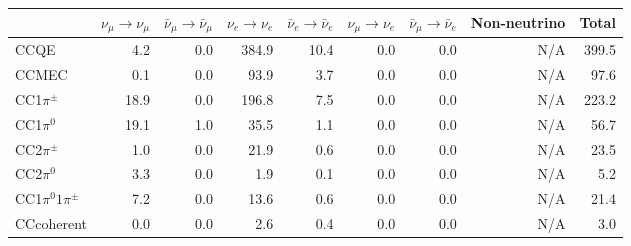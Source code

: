 \newpage
\begin{table}
\begin{adjustbox}{width=1\textwidth}
\begin{tabular} {l r r r r r r r r}
\hline

              & $\nu_{\mu} \rightarrow \nu_{\mu}$ & $\bar{\nu}_{\mu} \rightarrow \bar{\nu}_{\mu}$ & $\nu_{e} \rightarrow \nu_{e}$ & $\bar{\nu}_{e} \rightarrow \bar{\nu}_{e}$ & $\nu_{\mu} \rightarrow \nu_{e}$ & $\bar{\nu}_{\mu} \rightarrow \bar{\nu}_{e}$ & Non-neutrino         & Total                \\ \hline\hline
 CCQE         & 4.2                  & 0.0                  & 384.9                & 10.4                 & 0.0                  & 0.0                  & N/A                  & 399.5                \\ \hline
 CCMEC        & 0.1                  & 0.0                  & 93.9                 & 3.7                  & 0.0                  & 0.0                  & N/A                  & 97.6                 \\ \hline
 CC1$\pi^{\pm}$ & 18.9                 & 0.0                  & 196.8                & 7.5                  & 0.0                  & 0.0                  & N/A                  & 223.2                \\ \hline
 CC1$\pi^{0}$   & 19.1                 & 1.0                  & 35.5                 & 1.1                  & 0.0                  & 0.0                  & N/A                  & 56.7                 \\ \hline
 CC2$\pi^{\pm}$ & 1.0                  & 0.0                  & 21.9                 & 0.6                  & 0.0                  & 0.0                  & N/A                  & 23.5                 \\ \hline
 CC2$\pi^{0}$   & 3.3                  & 0.0                  & 1.9                  & 0.1                  & 0.0                  & 0.0                  & N/A                  & 5.2                  \\ \hline
 CC1$\pi^{0}1\pi^{\pm}$ & 7.2                  & 0.0                  & 13.6                 & 0.6                  & 0.0                  & 0.0                  & N/A                  & 21.4                 \\ \hline
 CCcoherent   & 0.0                  & 0.0                  & 2.6                  & 0.4                  & 0.0                  & 0.0                  & N/A                  & 3.0                  \\ \hline

\end{tabular}
\end{adjustbox}
\end{table}

